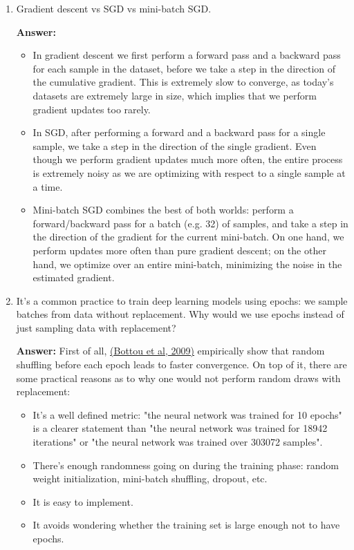 \documentclass{article}
\newenvironment{QandA}{\begin{enumerate}[label=\arabic*.]}{\end{enumerate}}
\newenvironment{answer}{\par\normalfont \textbf{Answer:}}{}
\begin{document}
\begin{QandA}
    \item Gradient descent vs SGD vs mini-batch SGD.
    \begin{answer}
        \begin{itemize}
            \item In gradient descent we first perform a forward pass and a backward pass for each sample in the dataset, before we take a step in the direction of the cumulative gradient. This is extremely slow to converge, as today's datasets are extremely large in size, which implies that we perform gradient updates too rarely. 
            \item In SGD, after performing a forward and a backward pass for a single sample, we take a step in the direction of the single gradient. Even though we perform gradient updates much more often, the entire process is extremely noisy as we are optimizing with respect to a single sample at a time. 
            \item Mini-batch SGD combines the best of both worlds: perform a forward/backward pass for a batch (e.g. 32) of samples, and take a step in the direction of the gradient for the current mini-batch. On one hand, we perform updates more often than pure gradient descent; on the other hand, we optimize over an entire mini-batch, minimizing the noise in the estimated gradient. 
        \end{itemize}   
    \end{answer}

    \item It’s a common practice to train deep learning models using epochs: we sample batches from data without replacement. Why would we use epochs instead of just sampling data with replacement?
    \begin{answer}
        First of all, \href{https://leon.bottou.org/publications/pdf/slds-2009.pdf}{(Bottou et al, 2009)} empirically show that random shuffling before each epoch leads to faster convergence. On top of it, there are some practical reasons as to why one would not perform random draws with replacement:
        \begin{itemize}
            \item It's a well defined metric: "the neural network was trained for 10 epochs" is a clearer statement than "the neural network was trained for 18942 iterations" or "the neural network was trained over 303072 samples".
            \item There's enough randomness going on during the training phase: random weight initialization, mini-batch shuffling, dropout, etc.
            \item It is easy to implement.
            \item It avoids wondering whether the training set is large enough not to have epochs.
        \end{itemize}
        

\end{answer}
\end{QandA}
\end{document}
